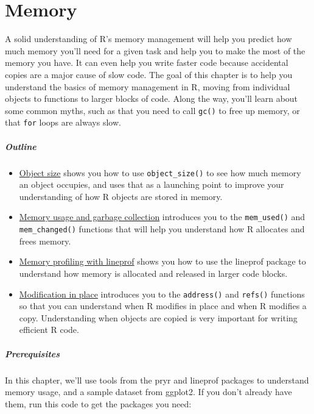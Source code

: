 \chapter{Memory}\label{memory}

A solid understanding of R's memory management will help you predict how
much memory you'll need for a given task and help you to make the most
of the memory you have. It can even help you write faster code because
accidental copies are a major cause of slow code. The goal of this
chapter is to help you understand the basics of memory management in R,
moving from individual objects to functions to larger blocks of code.
Along the way, you'll learn about some common myths, such as that you
need to call \texttt{gc()} to free up memory, or that \texttt{for} loops
are always slow. 

\paragraph{Outline}

\begin{itemize}
\item
  \hyperref[object-size]{Object size} shows you how to use
  \texttt{object\_size()} to see how much memory an object occupies, and
  uses that as a launching point to improve your understanding of how R
  objects are stored in memory.
\item
  \hyperref[gc]{Memory usage and garbage collection} introduces you to
  the \texttt{mem\_used()} and \texttt{mem\_changed()} functions that
  will help you understand how R allocates and frees memory.
\item
  \hyperref[memory-profiling]{Memory profiling with lineprof} shows you
  how to use the lineprof package to understand how memory is allocated
  and released in larger code blocks.
\item
  \hyperref[modification]{Modification in place} introduces you to the
  \texttt{address()} and \texttt{refs()} functions so that you can
  understand when R modifies in place and when R modifies a copy.
  Understanding when objects are copied is very important for writing
  efficient R code.
\end{itemize}

\paragraph{Prerequisites}

In this chapter, we'll use tools from the pryr and lineprof packages to
understand memory usage, and a sample dataset from ggplot2. If you don't
already have them, run this code to get the packages you need:

